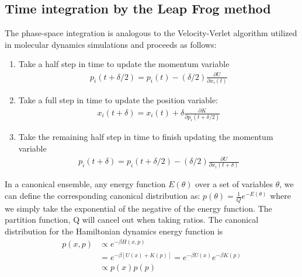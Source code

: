 \documentclass[book.tex]{subfiles}
\begin{document}
\subsection{Time integration by the Leap Frog method}
The phase-space integration is analogous to the Velocity-Verlet algorithm utilized in molecular dynamics simulations and proceeds as follows:
\begin{enumerate}
    \item Take a half step in time to update the momentum variable
    \begin{align}
    p_i(t + \delta/2) = p_i(t) - (\delta /2)\frac{\partial U}{\partial x_i(t)}
    \end{align}
    \item Take a full step in time to update the position variable:
    \begin{align}
    x_i(t + \delta) = x_i(t) + \delta \frac{\partial K}{\partial p_i(t + \delta/2)}
    \end{align}
    \item Take the remaining half step in time to finish updating the momentum variable
    \begin{align} 
    p_i(t + \delta) = p_i(t + \delta/2) - (\delta/2) \frac{\partial U}{\partial x_i(t+\delta)}
    \end{align}
\end{enumerate}

In a canonical ensemble,  any energy function $E(\theta)$ over a set of variables $\theta$, we can define the corresponding canonical distribution as: $p(\theta) = \frac{1}{Q}e^{-E(\theta)}$ where we simply take the exponential of the negative of the energy function. The partition function, Q will cancel out when taking ratios. The canonical distribution for the Hamiltonian dynamics energy function is
\begin{align}
p( x, p) & \propto e^{-\beta H( x, p)} \nonumber \\ & = e^{-\beta [U( x) + K( p)]} \nonumber = e^{-\beta U( x)}e^{-\beta K( p)} \nonumber \\ & \propto p( x)p( p)
\end{align}
\end{document}
